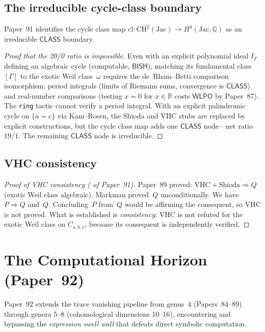 \documentclass[11pt]{article}
\theoremstyle{plain}
\theoremstyle{definition}
\theoremstyle{remark}
\newcommand{\QQ}{\mathbb{Q}}
\newcommand{\RR}{\mathbb{R}}
\newcommand{\Jac}{\mathrm{Jac}}
\newcommand{\CH}{\mathrm{CH}}
\newcommand{\BISH}{\mathsf{BISH}}
\newcommand{\WLPO}{\mathsf{WLPO}}
\newcommand{\CLASS}{\mathsf{CLASS}}
\begin{document}
\subsection{The irreducible cycle-class boundary}

Paper~91 identifies the cycle class map $\mathrm{cl}: \CH^2(\Jac) \to H^4(\Jac, \QQ)$ as an irreducible $\CLASS$ boundary.

\begin{proof}[Proof that the 20/0 ratio is impossible]
Even with an explicit polynomial ideal $I_\Gamma$ defining an algebraic cycle (computable, $\BISH$), matching its fundamental class $[\Gamma]$ to the exotic Weil class~$\omega$ requires the de~Rham--Betti comparison isomorphism: period integrals (limits of Riemann sums, convergence is $\CLASS$) and real-number comparisons (testing $x = 0$ for $x \in \RR$ costs $\WLPO$ by Paper~87).  The \texttt{ring} tactic cannot verify a period integral.  With an explicit palindromic cycle on $\{a = c\}$ via Kani--Rosen, the Shioda and VHC stubs are replaced by explicit constructions, but the cycle class map adds one $\CLASS$ node---net ratio $19/1$.  The remaining $\CLASS$ node is irreducible.
\end{proof}

\subsection{VHC consistency}

\begin{proof}[Proof of VHC consistency ( of Paper~91)]
Paper~89 proved: $\mathrm{VHC} + \text{Shioda} \Rightarrow Q$ (exotic Weil class algebraic).  Markman proved~$Q$ unconditionally.  We have $P \Rightarrow Q$ and~$Q$.  Concluding~$P$ from~$Q$ would be affirming the consequent, so VHC is not proved.  What is established is \emph{consistency}: VHC is not refuted for the exotic Weil class on $C_{a,b,c}$, because its consequent is independently verified.
\end{proof}


\section{The Computational Horizon (Paper~92)}\label{sec:computational}

Paper~92 \cite{p92} extends the trace vanishing pipeline from genus~4 (Papers~84--89) through genera 5--8 (cohomological dimensions 10--16), encountering and bypassing the \emph{expression swell wall} that defeats direct symbolic computation.
\end{document}
